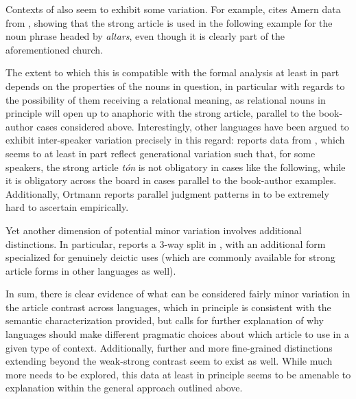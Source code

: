 \documentclass[output=paper
,modfonts
,nonflat]{langscibook}
\begin{document}
Contexts of   also seem to exhibit some
variation. For example, \citet{Wespel2008} cites Amern data from \citet{Heinrichs1954}, showing
that the strong article is used in the following example for the noun phrase headed by
\textit{altars}, even though it is clearly part of the aforementioned church.


The extent to which this is compatible with the formal analysis at
least in part depends on the properties of the nouns in question, in
particular with regards to the possibility of them receiving a
relational meaning, as relational nouns in principle will open up to
anaphoric  with the strong article, parallel to the
book-author cases considered above. Interestingly, other languages
have been argued to exhibit inter-speaker variation precisely in
this regard: \citet{Ortmann2014}  reports data from ,
which seems to at least in part reflect generational
  variation such that, for some speakers, the strong article
  \textit{t\'on} is not obligatory in cases like the following, while
  it is obligatory across the board in cases parallel to the
  book-author examples. Additionally, Ortmann reports parallel judgment
patterns in  to be extremely hard to ascertain empirically.

Yet another dimension of potential minor variation involves additional
distinctions. In particular, \citet{Ahn2016} reports a 3-way split in
, with an additional form specialized for genuinely deictic uses
(which are commonly available for strong article forms in other
languages as well).

In sum, there is clear evidence of what can be considered fairly minor
variation in the article contrast across languages, which in principle
is consistent with the semantic characterization provided, but calls
for further explanation of why languages should make different
pragmatic choices about which article to use in a given type of
context. Additionally, further and more fine-grained distinctions
extending beyond the weak-strong contrast seem to exist as
well. While much more needs to be explored, this data at least in
principle seems to be amenable to explanation within the general
approach outlined above.
\end{document}
